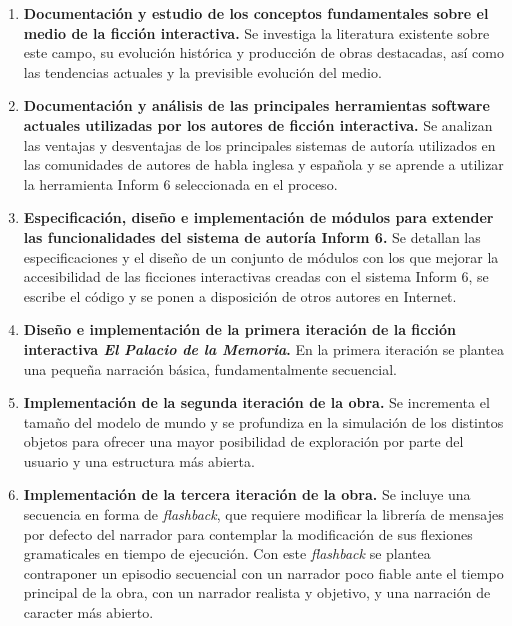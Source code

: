 \begin{enumerate}
	\item \textbf{Documentación y estudio de los conceptos fundamentales sobre el medio de la ficción interactiva.} Se investiga la literatura existente sobre este campo, su evolución histórica y producción de obras destacadas, así como las tendencias actuales y la previsible evolución del medio.

	\item \textbf{Documentación y análisis de las principales herramientas software actuales utilizadas por los autores de ficción interactiva.} Se analizan las ventajas y desventajas de los principales sistemas de autoría utilizados en las comunidades de autores de habla inglesa y española y se aprende a utilizar la herramienta Inform 6 seleccionada en el proceso.

	\item \textbf{Especificación, diseño e implementación de módulos para extender las funcionalidades del sistema de autoría Inform 6.} Se detallan las especificaciones y el diseño de un conjunto de módulos con los que mejorar la accesibilidad de las ficciones interactivas creadas con el sistema Inform 6, se escribe el código y se ponen a disposición de otros autores en Internet.

	\item \textbf{Diseño e implementación de la primera iteración de la ficción interactiva \emph{El Palacio de la Memoria}.} En la primera iteración se plantea una pequeña narración básica, fundamentalmente secuencial.

	\item \textbf{Implementación de la segunda iteración de la obra.} Se incrementa el tamaño del modelo de mundo y se profundiza en la simulación de los distintos objetos para ofrecer una mayor posibilidad de exploración por parte del usuario y una estructura más abierta.

	\item \textbf{Implementación de la tercera iteración de la obra.} Se incluye una secuencia en forma de \emph{flashback}, que requiere modificar la librería de mensajes por defecto del narrador para contemplar la modificación de sus flexiones gramaticales en tiempo de ejecución. Con este \emph{flashback} se plantea contraponer un episodio secuencial con un narrador poco fiable ante el tiempo principal de la obra, con un narrador realista y objetivo, y una narración de caracter más abierto.
\end{enumerate}
